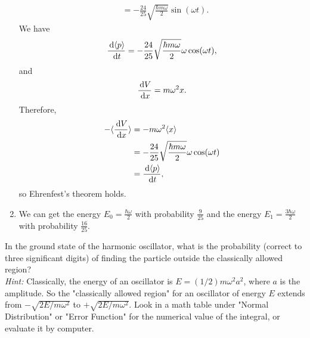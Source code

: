 \documentclass[en, oneside]{vivi}
\begin{document}
\begin{sol}
\begin{enumerate}[label=(\alph*)]
\begin{align*}
            &= -\frac{24}{25} \sqrt{\frac{\hbar m \omega}{2}} \sin(\omega t).
        \end{align*}
        We have
        \begin{equation*}
            \frac{\dif \langle p \rangle}{\dif t} = -\frac{24}{25} \sqrt{\frac{\hbar m \omega}{2}} \omega \cos(\omega t),
        \end{equation*}
        and
        \begin{equation*}
            \frac{\dif V}{\dif x} = m \omega^2 x.
        \end{equation*}
        Therefore,
        \begin{align*}
            - \langle \frac{\dif V}{\dif x} \rangle &= - m \omega^2 \langle x \rangle\\
            &= - \frac{24}{25} \sqrt{\frac{\hbar m \omega}{2}} \omega \cos(\omega t)\\
            &= \frac{\dif \langle p \rangle}{\dif t},
        \end{align*}
        so Ehrenfest's theorem holds.
        \item We can get the energy $E_0 = \frac{\hbar \omega}{2}$ with probability $\frac{9}{25}$ and the energy $E_1 = \frac{3\hbar \omega}{2}$ with probability $\frac{16}{25}$.
    \end{enumerate}
\end{sol}

\begin{prob}
    In the ground state of the harmonic oscillator, what is the probability (correct to three significant digits) of finding the particle outside the classically allowed region?\\ 
    \textit{Hint:} Classically, the energy of an oscillator is $E = (1/2) m \omega^2 a^2$, where $a$ is the amplitude. 
    So the "classically allowed region" for an oscillator of energy $E$ extends from $-\sqrt{2E/m\omega^2}$ to $+\sqrt{2E/m\omega^2}$. 
    Look in a math table under "Normal Distribution" or "Error Function" for the numerical value of the integral, or evaluate it by computer.
\end{prob}
\end{document}
